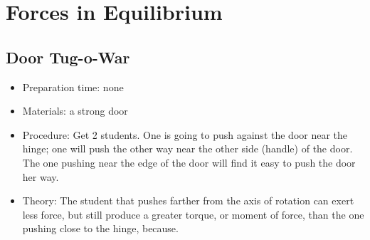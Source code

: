 \section{Forces in Equilibrium}


\subsection{Door Tug-o-War}
\begin{itemize}
\item{Preparation time: none}
\item{Materials: a strong door}
\item{Procedure: Get 2 students. One is going to push against the door near the hinge; one will push the other way near the other side (handle) of the door. The one pushing near the edge of the door will find it easy to push the door her way.}
\item{Theory: The student that pushes farther from the axis of rotation can exert less force, but still produce a greater torque, or moment of force, than the one pushing close to the hinge, because.}
\end{itemize}





